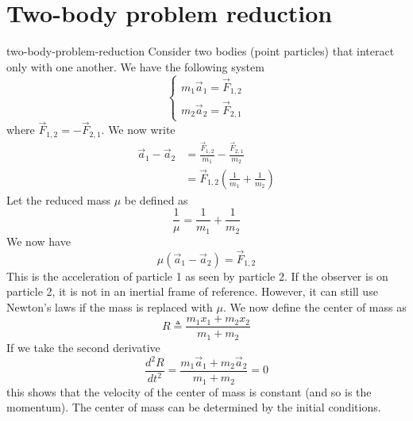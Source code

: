 \documentclass[preview]{standalone}
\begin{document}
\genpage

\section{Two-body problem reduction}

\begin{snippet}{two-body-problem-reduction}
    Consider two bodies (point particles) that interact only with one another.
    We have the following system
    \[
    \begin{cases}
        m_1\vec{a}_1 = \vec{F}_{1,2} \\
        m_2\vec{a}_2 = \vec{F}_{2,1}
    \end{cases}
    \]
    where \(\vec{F}_{1,2} = - \vec{F}_{2,1}\).
    We now write
    \begin{align*}
        \vec{a}_1 - \vec{a}_2 &= \frac{\vec{F}_{1,2}}{m_1} - \frac{\vec{F}_{2,1}}{m_2} \\
        &= \vec{F}_{1,2} \left(\frac{1}{m_1} + \frac{1}{m_2}\right)
    \end{align*}
    Let the reduced mass \(\mu\) be defined as
    \[
        \frac{1}{\mu} = \frac{1}{m_1} + \frac{1}{m_2}
    \]
    We now have
    \[
        \mu(\vec{a}_1 - \vec{a}_2) = \vec{F}_{1,2}
    \]
    This is the acceleration of particle 1 as seen by particle 2.
    If the observer is on particle 2, it is not in an inertial frame of reference.
    However, it can still use Newton's laws if the mass is replaced with \(\mu\).
    We now define the center of mass as
    \[
        R \triangleq \frac{m_1x_1 + m_2x_2}{m_1 + m_2}
    \]
    If we take the second derivative
    \[
        \frac{d^2R}{dt^2} = \frac{m_1\vec{a}_1 + m_2\vec{a}_2}{m_1 + m_2} = 0
    \]
    this shows that the velocity of the center of mass is constant (and so is the momentum).
    The center of mass can be determined by the initial conditions.
\end{snippet}
\end{document}
